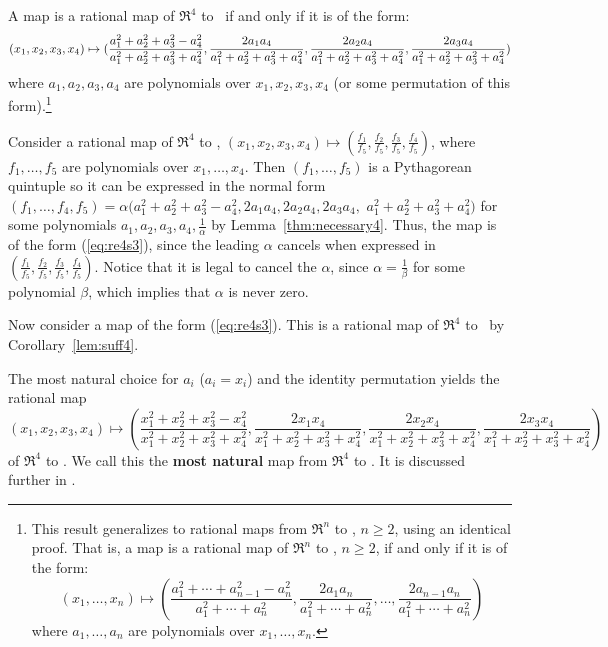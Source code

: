 \begin{corollary}
\label{thm:map4}
A map is a rational map of $\Re^4$ to \ if and only if
it is of the form:
\begin{equation}
\label{eq:re4s3}
\small{(x_1,x_2,x_3,x_4)} \mapsto 
\small{(\frac{a_1^2 + a_2^2 + a_3^2 - a_4^2}{a_1^2 + a_2^2 + a_3^2 + a_4^2},
	 \frac{2a_1a_4}{a_1^2 + a_2^2 + a_3^2 + a_4^2},
	 \frac{2a_2a_4}{a_1^2 + a_2^2 + a_3^2 + a_4^2},
	 \frac{2a_3a_4}{a_1^2 + a_2^2 + a_3^2 + a_4^2})}
\end{equation}
where $a_1,a_2,a_3,a_4$ are polynomials over $x_1,x_2,x_3,x_4$
(or some permutation of this form).\footnote{This result generalizes
	to rational maps from $\Re^n$ to , $n \geq 2$,
	using an identical proof.
	That is, a map is a rational map of $\Re^n$ to , $n \geq 2$, 
	if and only if it is of the form:
\[
	(x_1,\ldots,x_n) \mapsto
	(\frac{a_1^2 + \cdots + a_{n-1}^2 - a_n^2}{a_1^2 + \cdots + a_n^2},
	 \frac{2a_1a_n}{a_1^2 + \cdots + a_n^2},
	 \ldots,
	 \frac{2a_{n-1}a_n}{a_1^2 + \cdots + a_n^2})
\]
where $a_1,\ldots,a_n$ are polynomials over $x_1,\ldots,x_n$.}
\end{corollary}
\prf
Consider a rational map
of $\Re^4$ to , $(x_1,x_2,x_3,x_4) \mapsto 
(\frac{f_1}{f_5},\frac{f_2}{f_5},\frac{f_3}{f_5},\frac{f_4}{f_5})$,
where $f_1,\ldots,f_5$ are polynomials over $x_1,\ldots,x_4$.
Then $(f_1,\ldots,f_5)$ is a Pythagorean quintuple
so it can be expressed in the normal form
$(f_1,\ldots,f_4,f_5) = \alpha (a_1^2 + a_2^2 + a_3^2 - a_4^2,
2a_1a_4,2a_2a_4,2a_3a_4,$ $a_1^2 + a_2^2 + a_3^2 + a_4^2)$
for some polynomials $a_1,a_2,a_3,a_4,\frac{1}{\alpha}$
by Lemma~\ref{thm:necessary4}.
Thus, the map is of the form (\ref{eq:re4s3}), since the leading $\alpha$
cancels when expressed in 
$(\frac{f_1}{f_5},\frac{f_2}{f_5},\frac{f_3}{f_5},\frac{f_4}{f_5})$.
Notice that it is legal to cancel the $\alpha$, since
$\alpha = \frac{1}{\beta}$ for some polynomial $\beta$,
which implies that $\alpha$ is never zero.

Now consider a map of the form (\ref{eq:re4s3}).
This is a rational map of $\Re^4$ to \ by Corollary~\ref{lem:suff4}.
\QED

The most natural choice for $a_i$ ($a_i=x_i$) and the identity permutation
yields the rational map
\[
(x_1,x_2,x_3,x_4) \mapsto 
	(\frac{x_1^2 + x_2^2 + x_3^2 - x_4^2}{x_1^2 + x_2^2 + x_3^2 + x_4^2},
	 \frac{2x_1x_4}{x_1^2 + x_2^2 + x_3^2 + x_4^2}, 
	 \frac{2x_2x_4}{x_1^2 + x_2^2 + x_3^2 + x_4^2}, 
	 \frac{2x_3x_4}{x_1^2 + x_2^2 + x_3^2 + x_4^2})
\]
of $\Re^4$ to .
We call this the {\bf most natural} map from $\Re^4$ to .
It is discussed further in \cite{jj98}.

